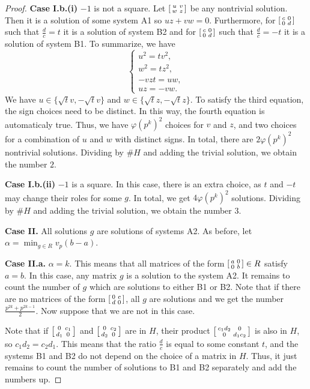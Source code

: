 \documentclass[10pt,leqno]{amsart}
\newcommand\sm[1]{\begin{bsmallmatrix}#1\end{bsmallmatrix}}
\theoremstyle{definition}
\theoremstyle{remark}
\numberwithin{theorem}{section}
\begin{document}
\begin{proof}
\noindent \textbf{Case I.b.(i)} $-1$ is not a square.
Let $\sm{u & v \\w & z}$ be any nontrivial solution. Then it is a solution of some system A1 so $uz+vw=0$. Furthermore, for $\sm{c & 0 \\ 0 & d}$ such that $\frac{d}{c}=t$ it is a solution of system B2 and for $\sm{c & 0 \\ 0 & d}$ such that $\frac{d}{c}=-t$ it is a solution of system B1. To summarize, we have \[
\begin{cases}
u^2=tv^2, \\[4pt]
w^2 =tz^2, \\[4pt]
-vzt=uw, \\[4pt]
uz=-vw.
\end{cases}
\]
We have $u\in\{\sqrt{t}v, -\sqrt{t}v\}$ and $w\in \{\sqrt{t}z, -\sqrt t z\}$. To satisfy the third equation, the sign choices need to be distinct. In this way, the fourth equation is automaticaly true. Thus, we have $\varphi(p^k)^2$ choices for $v$ and $z$, and two choices for a combination of $u$ and $w$ with distinct signs. In total, there are $2\varphi(p^k)^2$ nontrivial solutions. Dividing by $\#H$ and adding the trivial solution, we obtain the number $2$.

\noindent \textbf{Case I.b.(ii)} $-1$ is a square. In this case, there is an extra choice, as $t$ and $-t$ may change their roles for some $g$. In total, we get $4\varphi(p^k)^2$ solutions. Dividing by $\#H$ and adding the trivial solution, we obtain the number $3$.

\noindent \textbf{Case II.} All solutions $g$ are solutions of systems A2. As before, let $\alpha=\min_{g \in R} v_p(b-a)$. 

\noindent \textbf{Case II.a.} $\alpha=k$. This means that all matrices of the form $\sm{a & 0 \\ 0 & b}\in R$ satisfy $a=b$. In this case, any matrix $g$ is a solution to the system A2. It remains to count the number of $g$ which are solutions to either B1 or B2. Note that if there are no matrices of the form $\sm{0 & c  \\ d & 0}$, all $g$ are solutions and we get the number $\frac{p^{2k}+p^{2k-1}}{2}$. Now suppose that we are not in this case.

Note that if $\sm{0 & c_1 \\ d_1 & 0}$ and $\sm{0 & c_2 \\ d_2 & 0}$ are in $H$, their product $\sm{c_1d_2 & 0 \\ 0 & d_1c_2}$ is also in $H$, so $c_1d_2=c_2d_1$. This means that the ratio $\frac{d}{c}$ is equal to some constant $t$, and the systems B1 and B2 do not depend on the choice of a matrix in $H$. Thus, it just remains to count the number of solutions to B1 and B2 separately and add the numbers up.


\end{proof}
\end{document}
